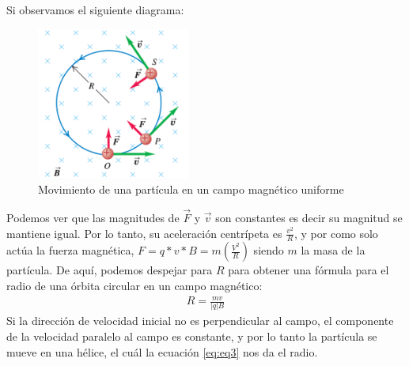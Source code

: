 \documentclass[12pt, letterpaper]{report}
\begin{document}
Si observamos el siguiente diagrama: 
\begin{figure}[H]
    \centering
    \includegraphics[height = 5cm]{Diagrama3_MovimientoCentripetaCampoMagnetico.png}
    \caption{Movimiento de una partícula en un campo magnético uniforme}
\end{figure}
Podemos ver que las magnitudes de $\vec{F}$ y $\vec{v}$ son constantes es decir su magnitud se mantiene igual. Por lo tanto, 
su aceleración centrípeta es $\frac{v^2}{R}$, y por como solo actúa la fuerza magnética, $F = q\ast v \ast B = m (\frac{V^2}{R})$ siendo $m$ 
la masa de la partícula. De aquí, podemos despejar para $R$ para obtener una fórmula para el radio de una órbita 
circular en un campo magnético: 
\begin{align}
R = \frac{mv}{|q|B}
\label{eq:eq3}
\end{align}
Si la dirección de velocidad inicial no es perpendicular al campo, el componente de la velocidad paralelo al campo es 
constante, y por lo tanto la partícula se mueve en una hélice, el cuál la ecuación \ref{eq:eq3} nos da el radio. 
\end{document}
